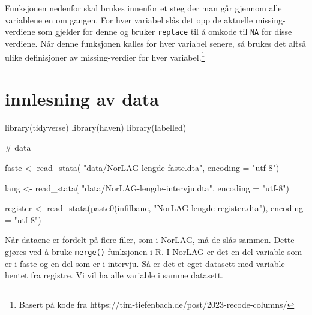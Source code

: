 \documentclass[
  norsk,
  letterpaper,
  DIV=11,
  numbers=noendperiod]{scrreprt}
\newenvironment{Shaded}{\begin{snugshade}}{\end{snugshade}}
\newcommand{\AttributeTok}[1]{\textcolor[rgb]{0.40,0.45,0.13}{#1}}
\newcommand{\CommentTok}[1]{\textcolor[rgb]{0.37,0.37,0.37}{#1}}
\newcommand{\FunctionTok}[1]{\textcolor[rgb]{0.28,0.35,0.67}{#1}}
\newcommand{\NormalTok}[1]{\textcolor[rgb]{0.00,0.23,0.31}{#1}}
\newcommand{\OtherTok}[1]{\textcolor[rgb]{0.00,0.23,0.31}{#1}}
\newcommand{\StringTok}[1]{\textcolor[rgb]{0.13,0.47,0.30}{#1}}
\theoremstyle{definition}
\theoremstyle{remark}
\begin{document}
Funksjonen nedenfor skal brukes innenfor et steg der man går gjennom
alle variablene en om gangen. For hver variabel slås det opp de aktuelle
missing-verdiene som gjelder for denne og bruker \texttt{replace} til å
omkode til \texttt{NA} for disse verdiene. Når denne funksjonen kalles
for hver variabel senere, så brukes det altså ulike definisjoner av
missing-verdier for hver variabel.\footnote{Basert på kode fra
  https://tim-tiefenbach.de/post/2023-recode-columns/}

\section{innlesning av data}\label{innlesning-av-data-1}

\begin{Shaded}
\begin{Highlighting}[]
\FunctionTok{library}\NormalTok{(tidyverse)}
\FunctionTok{library}\NormalTok{(haven)}
\FunctionTok{library}\NormalTok{(labelled)}

\CommentTok{\# data}

\NormalTok{faste }\OtherTok{\textless{}{-}} \FunctionTok{read\_stata}\NormalTok{( }\StringTok{"data/NorLAG{-}lengde{-}faste.dta"}\NormalTok{, }\AttributeTok{encoding =} \StringTok{"utf{-}8"}\NormalTok{)}

\NormalTok{lang }\OtherTok{\textless{}{-}} \FunctionTok{read\_stata}\NormalTok{( }\StringTok{"data/NorLAG{-}lengde{-}intervju.dta"}\NormalTok{, }\AttributeTok{encoding =} \StringTok{"utf{-}8"}\NormalTok{)}

\NormalTok{register }\OtherTok{\textless{}{-}} \FunctionTok{read\_stata}\NormalTok{(}\FunctionTok{paste0}\NormalTok{(infilbane, }\StringTok{"NorLAG{-}lengde{-}register.dta"}\NormalTok{), }\AttributeTok{encoding =} \StringTok{"utf{-}8"}\NormalTok{)}
\end{Highlighting}
\end{Shaded}

Når dataene er fordelt på flere filer, som i NorLAG, må de slås sammen.
Dette gjøres ved å bruke \texttt{merge()}-funksjonen i R. I NorLAG er
det en del variable som er i faste og en del som er i intervju. Så er
det et eget datasett med variable hentet fra registre. Vi vil ha alle
variable i samme datasett.
\end{document}
